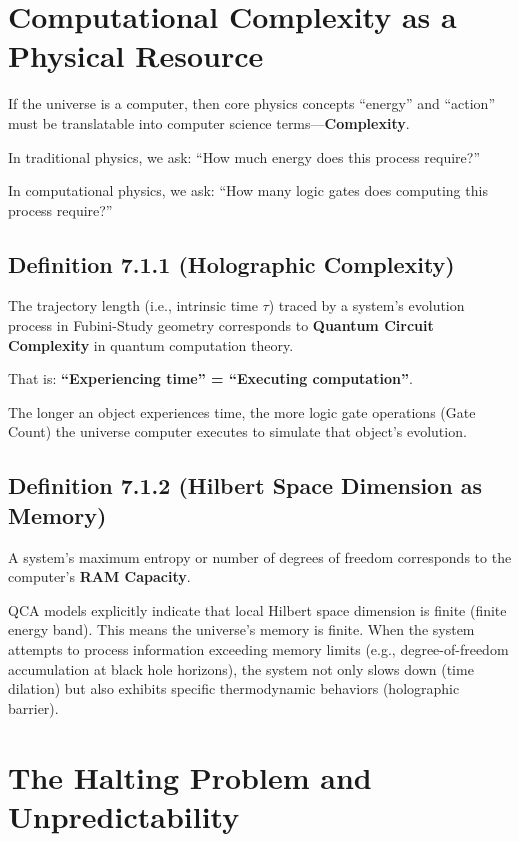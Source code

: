 \documentclass[11pt,a4paper,twoside]{book}
\begin{document}
\section{Computational Complexity as a Physical Resource}

If the universe is a computer, then core physics concepts ``energy'' and ``action'' must be translatable into computer science terms---\textbf{Complexity}.

In traditional physics, we ask: ``How much energy does this process require?''

In computational physics, we ask: ``How many logic gates does computing this process require?''

\subsection{Definition 7.1.1 (Holographic Complexity)}

The trajectory length (i.e., intrinsic time $\tau$) traced by a system's evolution process in Fubini-Study geometry corresponds to \textbf{Quantum Circuit Complexity} in quantum computation theory.

That is: \textbf{``Experiencing time'' = ``Executing computation''}.

The longer an object experiences time, the more logic gate operations (Gate Count) the universe computer executes to simulate that object's evolution.

\subsection{Definition 7.1.2 (Hilbert Space Dimension as Memory)}

A system's maximum entropy or number of degrees of freedom corresponds to the computer's \textbf{RAM Capacity}.

QCA models explicitly indicate that local Hilbert space dimension is finite (finite energy band). This means the universe's memory is finite. When the system attempts to process information exceeding memory limits (e.g., degree-of-freedom accumulation at black hole horizons), the system not only slows down (time dilation) but also exhibits specific thermodynamic behaviors (holographic barrier).

\section{The Halting Problem and Unpredictability}
\end{document}
